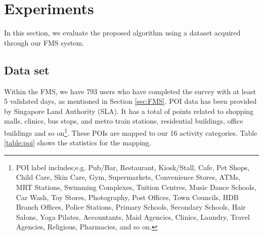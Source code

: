 \documentclass{sig-alternate}
\begin{document}
\section{Experiments}
In this section, we evaluate the proposed algorithm using a dataset acquired through our FMS system.


\subsection{Data set}
Within the FMS, we have 793 users who have completed the survey with at least 5 validated days, as mentioned in Section \ref{sec:FMS}. POI data has been provided by Singapore Land Authority (SLA). It has a total of  points related to shopping malls, clinics, bus stops, and metro train stations, residential buildings, office buildings and so on\footnote{\scriptsize{POI label includes;e.g. Pub/Bar, Restaurant, Kiosk/Stall, Cafe, Pet Shops, Child Care, Skin Care, Gym, Supermarkets, Convenience Stores, ATMs, MRT Stations, Swimming Complexes, Tuition Centres, Music Dance Schools, Car Wash, Toy Stores, Photography, Post Offices, Town Councils, HDB Branch Offices, Police Stations, Primary Schools, Secondary Schools, Hair Salons, Yoga Pilates, Accountants, Maid Agencies, Clinics, Laundry, Travel Agencies, Religious, Pharmacies, and so on.}}. These POIs are mapped to our 16 activity categories. Table \ref{table:poi} shows the statistics for the mapping.
\end{document}
